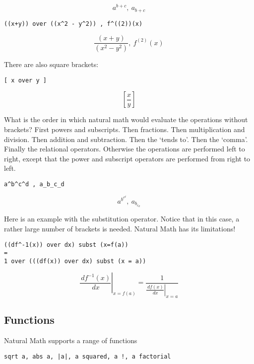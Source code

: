 \documentclass[12pt]{article}
\begin{document}
\[
{a} ^ {b + c} , \ {a} _ {b + c}
\]

\begin{verbatim}
((x+y)) over ((x^2 - y^2)) , f^((2))(x)
\end{verbatim}

\[
\frac {\left( x + y \right)} {\left( {x} ^ {2} - {y} ^ {2} \right)} , \ {f} ^ {\left( 2 \right)} \left( x \right)
\]

\noindent There are also square brackets:

\begin{verbatim}
[ x over y ]
\end{verbatim}

\[
\left[ \frac {x} {y} \right]
\]

\noindent What is the order in which natural math would evaluate the operations without
brackets?  First powers and subscripts.  Then fractions.  Then multiplication
and division.  Then addition and subtraction.  Then the `tends to'.  Then
the `comma'.  Finally the relational operators.  Otherwise the operations
are performed left to right, except that the power and subscript operators
are performed from right to left.

\begin{verbatim}
a^b^c^d , a_b_c_d
\end{verbatim}

\[
{a} ^ {{b} ^ {{c} ^ {d}}} , \ {a} _ {{b} _ {{c} _ {d}}}
\]

\noindent Here is an example with the substitution operator.  Notice that in this case,
a rather large number of brackets is needed.  Natural Math has its limitations!

\begin{verbatim}
((df^-1(x)) over dx) subst (x=f(a))
=
1 over (((df(x)) over dx) subst (x = a))
\end{verbatim}

\[
\left.\frac {{\,d f} ^ { - 1} \left( x \right)} {\,d x}\right|_{x = f \left( a \right)} = \frac {1} {\left.\frac {\,d f \left( x \right)} {\,d x}\right|_{x = a}}
\]

\noindent \subsection{Functions}

\noindent \indent
Natural Math supports a range of functions

\begin{verbatim}
sqrt a, abs a, |a|, a squared, a !, a factorial
\end{verbatim}
\end{document}
